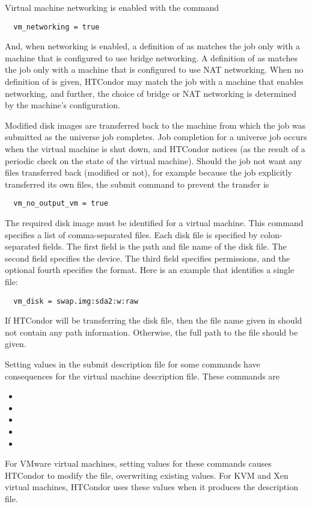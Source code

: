 Virtual machine networking is enabled with the command
\begin{verbatim}
  vm_networking = true
\end{verbatim}
And, when networking is enabled, a definition of
 as 
matches the job only with a machine that is configured to use
bridge networking.
A definition of
 as 
matches the job only with a machine that is configured to use
NAT networking.
When no definition of
 is given,
HTCondor may
match the job with a machine that enables networking,
and further, the choice of bridge or NAT networking
is determined by the machine's configuration.

Modified disk images are transferred back to the machine from which
the job was submitted as the  universe job completes.
Job completion for a  universe job occurs when 
the virtual machine is shut down, and HTCondor notices 
(as the result of a periodic check on the state of the virtual machine).
Should the job not want any files transferred back (modified or not),
for example because the job explicitly transferred its own files,
the submit command to prevent the transfer is
\begin{verbatim}
  vm_no_output_vm = true
\end{verbatim}

The required disk image must be identified for a virtual machine.
This  command specifies a list of comma-separated files.
Each disk file is specified by colon-separated fields.
The first field is the path and file name of the disk file.
The second field specifies the device.
The third field specifies permissions, and the optional 
fourth specifies the format.
Here is an example that identifies a single file:
\footnotesize
\begin{verbatim}
  vm_disk = swap.img:sda2:w:raw
\end{verbatim}
\normalsize

If HTCondor will be transferring the disk file, then the file name given
in  should not contain any path information.
Otherwise, the full path to the file should be given.

Setting values in the submit description file for some commands
have consequences for the virtual machine description file.
These commands are
\begin{itemize}
  \item {}
  \item {}
  \item {}
  \item {}
  \item {}
\end{itemize}
For VMware virtual machines,
setting values for these commands causes HTCondor to modify the
 file, overwriting existing values.
For KVM and Xen virtual machines,
HTCondor uses these values when it produces the description file.


